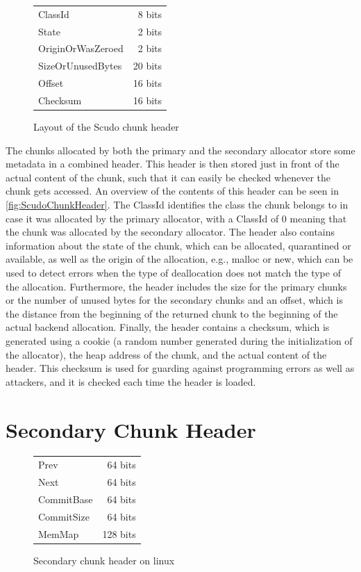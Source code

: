 \documentclass[a4paper,11pt,oneside]{report}
\begin{document}
\begin{figure}[h]
  \centering
  \begin{tabular}{l r}
    \toprule
    ClassId & 8 bits \\
    State & 2 bits \\
    OriginOrWasZeroed & 2 bits \\
    SizeOrUnusedBytes & 20 bits \\
    Offset & 16 bits \\
    Checksum & 16 bits \\
    \bottomrule
  \end{tabular}
  \caption{Layout of the Scudo chunk header}\label{fig:ScudoChunkHeader}
\end{figure}

The chunks allocated by both the primary and the secondary allocator store some metadata
in a combined header. This header is then stored just in front of the actual content of
the chunk, such that it can easily be checked whenever the chunk gets accessed. An
overview of the contents of this header can be seen in \autoref{fig:ScudoChunkHeader}. The
ClassId identifies the class the chunk belongs to in case it was allocated by the primary
allocator, with a ClassId of 0 meaning that the chunk was allocated by the secondary
allocator. The header also contains information about the state of the chunk, which can be
allocated, quarantined or available, as well as the origin of the allocation, e.g., malloc
or new, which can be used to detect errors when the type of deallocation does not match
the type of the allocation. Furthermore, the header includes the size for the primary
chunks or the number of unused bytes for the secondary chunks and an offset, which is the
distance from the beginning of the returned chunk to the beginning of the actual backend
allocation.  Finally, the header contains a checksum, which is generated using a cookie (a
random number generated during the initialization of the allocator), the heap address of
the chunk, and the actual content of the header. This checksum is used for guarding
against programming errors as well as attackers, and it is checked each time the header is
loaded.

\section{Secondary Chunk Header}

\begin{figure}[h]
  \centering
  \begin{tabular}{l r}
    \toprule
    Prev & 64 bits \\
    Next & 64 bits \\
    CommitBase & 64 bits \\
    CommitSize & 64 bits \\
    MemMap & 128 bits \\
    \bottomrule
  \end{tabular}
  \caption{Secondary chunk header on linux}\label{fig:ScudoSecondaryChunkHeader}
\end{figure}
\end{document}
